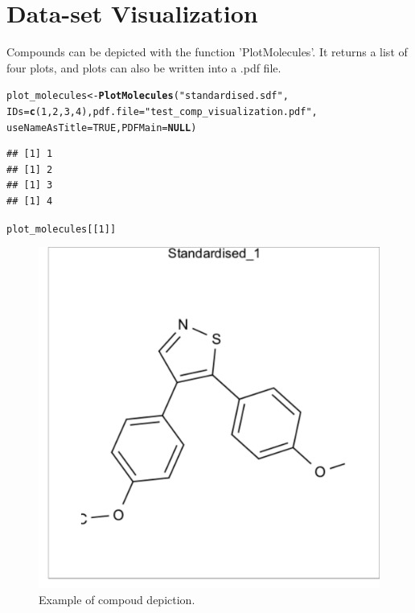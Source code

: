 \documentclass[twoside,a4wide,12pt]{article}\usepackage[]{graphicx}\usepackage[]{color}
\makeatletter
\newcommand{\hlnum}[1]{\textcolor[rgb]{0.686,0.059,0.569}{#1}}%
\newcommand{\hlstr}[1]{\textcolor[rgb]{0.192,0.494,0.8}{#1}}%
\newcommand{\hlstd}[1]{\textcolor[rgb]{0.345,0.345,0.345}{#1}}%
\newcommand{\hlkwa}[1]{\textcolor[rgb]{0.161,0.373,0.58}{\textbf{#1}}}%
\newcommand{\hlkwb}[1]{\textcolor[rgb]{0.69,0.353,0.396}{#1}}%
\newcommand{\hlkwc}[1]{\textcolor[rgb]{0.333,0.667,0.333}{#1}}%
\newcommand{\hlkwd}[1]{\textcolor[rgb]{0.737,0.353,0.396}{\textbf{#1}}}%
\newenvironment{kframe}{%
 \def\at@end@of@kframe{}%
 \ifinner\ifhmode%
  \def\at@end@of@kframe{\end{minipage}}%
  \begin{minipage}{\columnwidth}%
 \fi\fi%
 \def\FrameCommand##1{\hskip\@totalleftmargin \hskip-\fboxsep
 \colorbox{shadecolor}{##1}\hskip-\fboxsep
     \hskip-\linewidth \hskip-\@totalleftmargin \hskip\columnwidth}%
 \MakeFramed {\advance\hsize-\width
   \@totalleftmargin\z@ \linewidth\hsize
   \@setminipage}}%
 {\par\unskip\endMakeFramed%
 \at@end@of@kframe}
\newenvironment{knitrout}{}{} %
\makeatother
\begin{document}
\section{Data-set Visualization}
Compounds can be depicted with the function 'PlotMolecules'. It returns a list of four plots, and plots can also be written into a .pdf file.
\begin{knitrout}
\color{fgcolor}\begin{kframe}
\begin{alltt}
\hlstd{plot_molecules} \hlkwb{<-} \hlkwd{PlotMolecules}\hlstd{(}\hlstr{"standardised.sdf"}\hlstd{,}
    \hlkwc{IDs} \hlstd{=} \hlkwd{c}\hlstd{(}\hlnum{1}\hlstd{,} \hlnum{2}\hlstd{,} \hlnum{3}\hlstd{,} \hlnum{4}\hlstd{),} \hlkwc{pdf.file} \hlstd{=} \hlstr{"test_comp_visualization.pdf"}\hlstd{,}
    \hlkwc{useNameAsTitle} \hlstd{=} \hlnum{TRUE}\hlstd{,} \hlkwc{PDFMain} \hlstd{=} \hlkwa{NULL}\hlstd{)}
\end{alltt}
\begin{verbatim}
## [1] 1
## [1] 2
## [1] 3
## [1] 4
\end{verbatim}
\begin{alltt}
\hlstd{plot_molecules[[}\hlnum{1}\hlstd{]]}
\end{alltt}
\end{kframe}\begin{figure}[]


{\centering \includegraphics[width=12cm]{figure/unnamed-chunk-19} 

}

\caption[Example of compoud depiction]{Example of compoud depiction.\label{fig:unnamed-chunk-19}}
\end{figure}


\end{knitrout}
\end{document}
